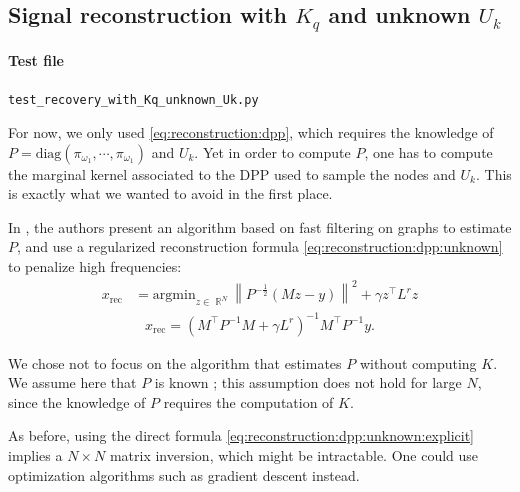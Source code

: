 \documentclass{article}
\newcommand{\norm}[1]{\left\|#1\right\|}
\DeclareMathOperator{\R}{\mathbb{R}}
\begin{document}
\subsection[Signal reconstruction with Kq and unknown Uk]{Signal reconstruction with $K_q$ and unknown $U_k$}


\paragraph{Test file} \verb#test_recovery_with_Kq_unknown_Uk.py#


For now, we only used \eqref{eq:reconstruction:dpp}, which requires the knowledge of $P = \mathrm{diag} (\pi_{\omega_1}, \cdots, \pi_{\omega_1})$ and $U_k$. Yet in order to compute $P$, one has to compute the marginal kernel associated to the DPP used to sample the nodes and $U_k$. This is exactly what we wanted to avoid in the first place.


In \cite{tremblay2017}, the authors present an algorithm based on fast filtering on graphs to estimate $P$, and use a regularized reconstruction formula \eqref{eq:reconstruction:dpp:unknown} to penalize high frequencies:
\begin{align*}
x_\text{rec} &= \mathrm{argmin}_{z \in \R^N} \norm{P^{-\frac{1}{2}} \left( M z - y \right)}^2 + \gamma z^\top L^r z
\end{align*}
\begin{align} \boxed{x_\text{rec} = (M^\top P^{-1} M + \gamma L^r)^{-1} M^\top P^{-1} y}. \label{eq:reconstruction:dpp:unknown:explicit} \end{align}


We chose not to focus on the algorithm that estimates $P$ without computing $K$. We assume here that $P$ is known ; this assumption does not hold for large $N$, since the knowledge of $P$ requires the computation of $K$. 


As before, using the direct formula \eqref{eq:reconstruction:dpp:unknown:explicit} implies a $N \times N$ matrix inversion, which might be intractable. One could use optimization algorithms such as gradient descent instead.
\end{document}
